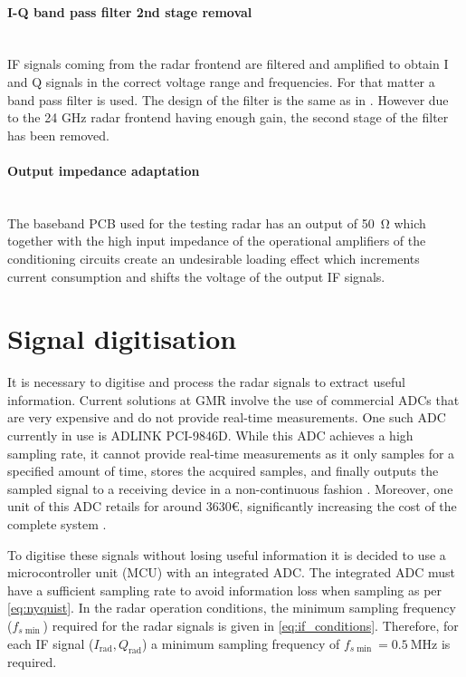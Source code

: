 	\paragraph{I-Q band pass filter 2nd stage removal}\mbox{}\\
	IF signals coming from the radar frontend are filtered and amplified to obtain I and Q signals in the correct voltage range and frequencies. For that matter a band pass filter is used. The design of the filter is the same as in \cite[p.~12-14]{Sardinero2022}. However due to the 24 GHz radar frontend having enough gain, the second stage of the filter has been removed.
	
	\paragraph{Output impedance adaptation}\mbox{}\\	
	The baseband PCB used for the testing radar has an output of \SI{50}{\ohm} which together with the high input impedance of the operational amplifiers of the conditioning circuits create an undesirable loading effect which increments current consumption and shifts the voltage of the output IF signals.
	
	
	
	
	
	

	
	\section{Signal digitisation}
	
	It is necessary to digitise and process the radar signals to extract useful information. Current solutions at GMR involve the use of commercial ADCs that are very expensive and do not provide real-time measurements. One such ADC currently in use is ADLINK PCI-9846D. While this ADC achieves a high sampling rate, it cannot provide real-time measurements as it only samples for a specified amount of time, stores the acquired samples, and finally outputs the sampled signal to a receiving device in a non-continuous fashion \cite[p.~43-44]{ADLINKTechnologies2010}. Moreover, one unit of this ADC retails for around 3630€, significantly increasing the cost of the complete system \cite[p.~53]{Moreno2020}.
	
		
	To digitise these signals without losing useful information it is decided to use a microcontroller unit (MCU) with an integrated ADC. The integrated ADC must have a sufficient sampling rate to avoid information loss when sampling as per \cref{eq:nyquist}. In the radar operation conditions, the minimum sampling frequency ($f_{s\min}$) required for the radar signals is given in \cref{eq:if_conditions}. Therefore, for each IF signal ($I_\mathrm{rad}, Q_\mathrm{rad}$) a minimum sampling frequency of $f_{s\min} = \SI{0.5}{\mega\hertz}$ is required.
	
